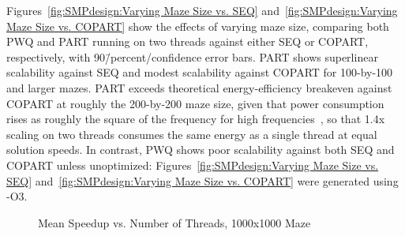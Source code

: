 Figures~\ref{fig:SMPdesign:Varying Maze Size vs. SEQ}
and~\ref{fig:SMPdesign:Varying Maze Size vs. COPART}
show the effects of varying maze size, comparing both PWQ and PART
running on two threads
against either SEQ or COPART, respectively, with 90\=/percent\-/confidence
error bars.
PART shows superlinear scalability against SEQ and modest scalability
against COPART for 100-by-100 and larger mazes.
PART exceeds theoretical energy-efficiency breakeven against COPART at roughly
the 200-by-200 maze size, given that power consumption rises as roughly
the square of the frequency for high frequencies~\cite{TrevorMudge2000Power},
so that 1.4x scaling on two threads consumes the same energy
as a single thread at equal solution speeds.
In contrast, PWQ shows poor scalability against both SEQ and COPART
unless unoptimized: Figures~\ref{fig:SMPdesign:Varying Maze Size vs. SEQ} 
and~\ref{fig:SMPdesign:Varying Maze Size vs. COPART}
were generated using -O3.
\fi

\begin{figure}[tb]
\centering
{}
\caption{Mean Speedup vs. Number of Threads, 1000x1000 Maze}
\label{fig:SMPdesign:Mean Speedup vs. Number of Threads, 1000x1000 Maze}
\end{figure}

